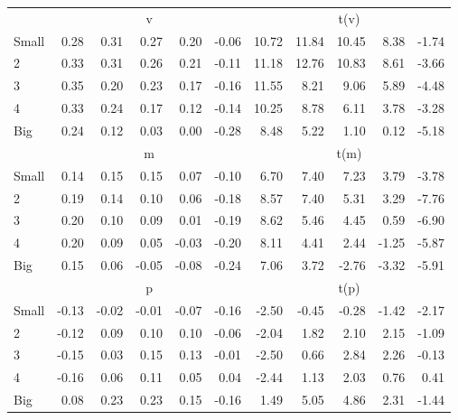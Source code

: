 \begin{table}[!ht]
\begin{tabular}{lrrrrrrrrrr}
  
     & \multicolumn{5}{c}{v} & \multicolumn{5}{c}{t(v)}   \\
     \cmidrule(r){2-6} \cmidrule(r){7-11} 
    Small  & 0.28  & 0.31  & 0.27  & 0.20  & -0.06  & 10.72  & 11.84  & 10.45  & 8.38  & -1.74   \\
    2  & 0.33  & 0.31  & 0.26  & 0.21  & -0.11  & 11.18  & 12.76  & 10.83  & 8.61  & -3.66   \\
    3  & 0.35  & 0.20  & 0.23  & 0.17  & -0.16  & 11.55  & 8.21  & 9.06  & 5.89  & -4.48   \\
    4  & 0.33  & 0.24  & 0.17  & 0.12  & -0.14  & 10.25  & 8.78  & 6.11  & 3.78  & -3.28   \\
    Big  & 0.24  & 0.12  & 0.03  & 0.00  & -0.28  & 8.48  & 5.22  & 1.10  & 0.12  & -5.18   \\
    
  
     & \multicolumn{5}{c}{m} & \multicolumn{5}{c}{t(m)}   \\
     \cmidrule(r){2-6} \cmidrule(r){7-11} 
    Small  & 0.14  & 0.15  & 0.15  & 0.07  & -0.10  & 6.70  & 7.40  & 7.23  & 3.79  & -3.78   \\
    2  & 0.19  & 0.14  & 0.10  & 0.06  & -0.18  & 8.57  & 7.40  & 5.31  & 3.29  & -7.76   \\
    3  & 0.20  & 0.10  & 0.09  & 0.01  & -0.19  & 8.62  & 5.46  & 4.45  & 0.59  & -6.90   \\
    4  & 0.20  & 0.09  & 0.05  & -0.03  & -0.20  & 8.11  & 4.41  & 2.44  & -1.25  & -5.87   \\
    Big  & 0.15  & 0.06  & -0.05  & -0.08  & -0.24  & 7.06  & 3.72  & -2.76  & -3.32  & -5.91   \\
    
  
     & \multicolumn{5}{c}{p} & \multicolumn{5}{c}{t(p)}   \\
     \cmidrule(r){2-6} \cmidrule(r){7-11} 
    Small  & -0.13  & -0.02  & -0.01  & -0.07  & -0.16  & -2.50  & -0.45  & -0.28  & -1.42  & -2.17   \\
    2  & -0.12  & 0.09  & 0.10  & 0.10  & -0.06  & -2.04  & 1.82  & 2.10  & 2.15  & -1.09   \\
    3  & -0.15  & 0.03  & 0.15  & 0.13  & -0.01  & -2.50  & 0.66  & 2.84  & 2.26  & -0.13   \\
    4  & -0.16  & 0.06  & 0.11  & 0.05  & 0.04  & -2.44  & 1.13  & 2.03  & 0.76  & 0.41   \\
    Big  & 0.08  & 0.23  & 0.23  & 0.15  & -0.16  & 1.49  & 5.05  & 4.86  & 2.31  & -1.44   \\
    
  
  \bottomrule
\end{tabular}
\label{tbl:25_Size_Beta_B16}
\end{table}